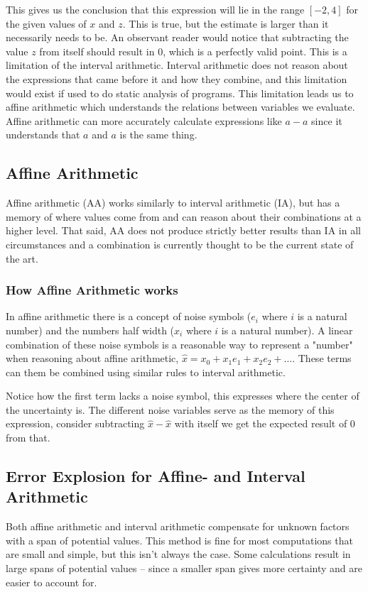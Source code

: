 This gives us the conclusion that this expression will lie in the range $[-2, 4]$ for the given values of $x$ and $z$. This is true, but the estimate is larger than it necessarily needs to be. An observant reader would notice that subtracting the value $z$ from itself should result in $0$, which is a perfectly valid point. This is a limitation of the interval arithmetic. Interval arithmetic does not reason about the expressions that came before it and how they combine, and this limitation would exist if used to do static analysis of programs. This limitation leads us to affine arithmetic which understands the relations between variables we evaluate. Affine arithmetic can more accurately calculate expressions like $a - a$ since it understands that $a$ and $a$ is the same thing.


\subsection{Affine Arithmetic}
Affine arithmetic (AA) works similarly to interval arithmetic (IA), but has a memory of where values come from and can reason about their combinations at a higher level. That said, AA does not produce strictly better results than IA in all circumstances and a combination is currently thought to be the current state of the art. 

\subsubsection{How Affine Arithmetic works}
In affine arithmetic there is a concept of noise symbols ($e_i$ where $i$ is a natural number) and the numbers half width ($x_i$ where $i$ is a natural number). A linear combination of these noise symbols is a reasonable way to represent a "number" when reasoning about affine arithmetic, $\hat{x} = x_0 + x_1e_1 + x_2e_2 + \dots$. These terms can them be combined using similar rules to interval arithmetic.

Notice how the first term lacks a noise symbol, this expresses where the center of the uncertainty is. The different noise variables serve as the memory of this expression, consider subtracting $\hat{x} - \hat{x}$ with itself we get the expected result of 0 from that.


\subsection{Error Explosion for Affine- and Interval Arithmetic}
Both affine arithmetic and interval arithmetic compensate for unknown factors with a span of potential values. This method is fine for most computations that are small and simple, but this isn't always the case. Some calculations result in large spans of potential values -- since a smaller span gives more certainty and are easier to account for.

